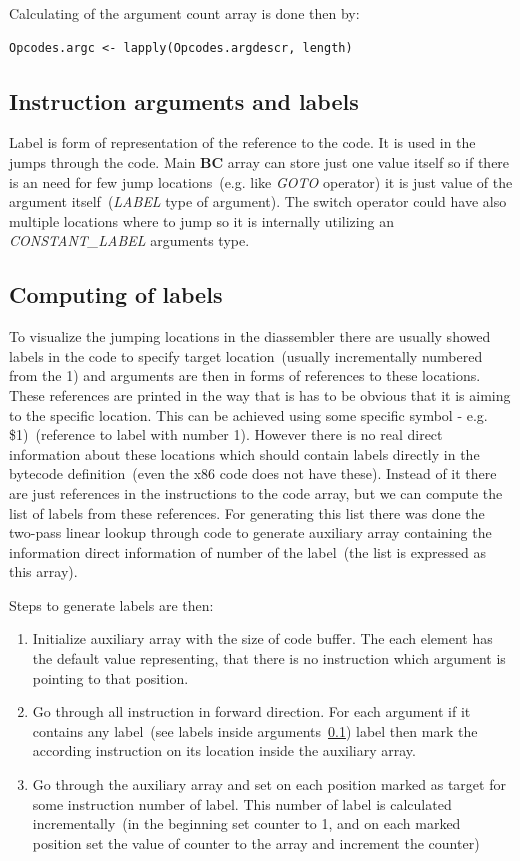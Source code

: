 \documentclass[thesis=M,english]{FITthesis}[2018/10/20]
\begin{document}
Calculating of the argument count array is done then by:

\begin{lstlisting}
Opcodes.argc <- lapply(Opcodes.argdescr, length)
\end{lstlisting}

\subsection{Instruction arguments and labels}\label{instruction-arguments-labels}

Label is form of representation of the reference to the code. It is used in the jumps through the code. Main \textbf{BC} array can store just one value itself so if there is an need for few jump locations~(e.g. like \textit{GOTO} operator) it is just value of the argument itself~(\textit{LABEL} type of argument). The switch operator could have also multiple locations where to jump so it is internally utilizing an \textit{CONSTANT{\_}LABEL} arguments type.

\subsection{Computing of labels}

To visualize the jumping locations in the diassembler there are usually showed labels in the code to specify target location~(usually incrementally numbered from the 1) and arguments are then in forms of references to these locations. These references are printed in the way that is has to be obvious that it is aiming to the specific location. This can be achieved using some specific symbol - e.g. {\$}1)~(reference to label with number 1). 
However there is no real direct information about these locations which should contain labels directly in the bytecode definition~(even the x86 code does not have these). Instead of it there are just references in the instructions to the code array, but we can compute the list of labels from these references. For generating this list there was done the two-pass linear lookup through code to generate auxiliary array containing the information direct information of number of the label~(the list is expressed as this array).

Steps to generate labels are then:
\begin{enumerate}
	\item Initialize auxiliary array with the size of code buffer. The each element has the default value representing, that there is no instruction which argument is pointing to that position.
	\item Go through all instruction in forward direction. For each argument if it contains any label~(see labels inside arguments~\ref{instruction-arguments-labels}) label then mark the according instruction on its location inside the auxiliary array.
	\item Go through the auxiliary array and set on each position marked as target for some instruction number of label. This number of label is calculated incrementally~(in the beginning set counter to 1, and on each marked position set the value of counter to the array and increment the counter)
\end{enumerate}
\end{document}
